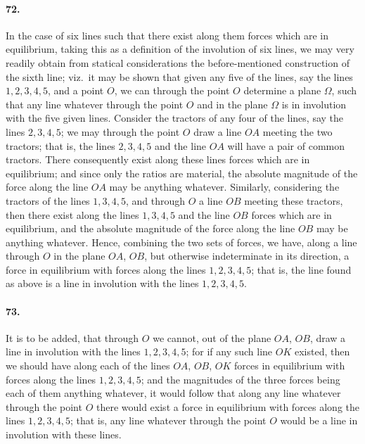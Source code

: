 \documentclass[11pt,a4paper]{article}
\begin{document}
\paragraph{72.}
In the case of six lines such that there exist along them forces which are
in equilibrium, taking this as a definition of the involution of six lines, we may very
readily obtain from statical considerations the before-mentioned construction of the sixth
line; viz.\ it may be shown that given any five of the lines, say the lines $1, 2, 3, 4, 5$,
and a point $O$, we can through the point $O$ determine a plane $\Omega$, such that any
line whatever through the point $O$ and in the plane $\Omega$ is in involution with the
five given lines. Consider the tractors of any four of the lines, say the lines $2, 3, 4, 5$;
we may through the point $O$ draw a line $OA$ meeting the two tractors; that is, the
lines $2, 3, 4, 5$ and the line $OA$ will have a pair of common tractors. There
consequently exist along these lines forces which are in equilibrium; and since only the
ratios are material, the absolute magnitude of the force along the line $OA$ may be
anything whatever. Similarly, considering the tractors of the lines $1, 3, 4, 5$, and
through $O$ a line $OB$ meeting these tractors, then there exist along the lines $1, 3, 4, 5$
and the line $OB$ forces which are in equilibrium, and the absolute magnitude of the
force along the line $OB$ may be anything whatever. Hence, combining the two sets of
forces, we have, along a line through $O$ in the plane $OA$, $OB$, but otherwise
indeterminate in its direction, a force in equilibrium with forces along the lines
$1, 2, 3, 4, 5$; that is, the line found as above is a line in involution with the lines
$1, 2, 3, 4, 5$.

\paragraph{73.}
It is to be added, that through $O$ we cannot, out of the plane $OA$, $OB$,
draw a line in involution with the lines $1, 2, 3, 4, 5$; for if any such line $OK$
existed, then we should have along each of the lines $OA$, $OB$, $OK$ forces in equilibrium
with forces along the lines $1, 2, 3, 4, 5$; and the magnitudes of the three forces
being each of them anything whatever, it would follow that along any line whatever
through the point $O$ there would exist a force in equilibrium with forces along the
lines $1, 2, 3, 4, 5$; that is, any line whatever through the point $O$ would be a line
in involution with these lines.
\end{document}
